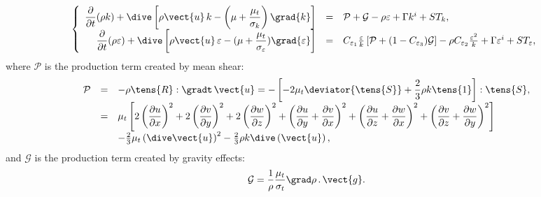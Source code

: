 \begin{equation}
\left\{
\begin{array}{r c l}
\displaystyle\frac{\partial }{\partial t}(\rho k)+\dive\left[ \rho \vect{u}%
\,k- \left( \mu +\frac{\mu _{t}}{\sigma _{k}} \right)\grad{k}\right] 
&=&
\mathcal{P}+\mathcal{G}-\rho \varepsilon +\Gamma k^{i}+ST_{k}, \\
\displaystyle\frac{\partial }{\partial t}(\rho \varepsilon )+\dive\left[
\rho \vect{u}\,\varepsilon -(\mu +\frac{\mu _{t}}{\sigma _{\varepsilon }})%
\grad{\varepsilon}\right] &=&C_{\varepsilon _{1}}\frac{\varepsilon }{k}\left[
\mathcal{P}+(1-C_{\varepsilon _{3}})\mathcal{G}\right] -\rho C_{\varepsilon
_{2}}\frac{\varepsilon ^{2}}{k}+\Gamma \varepsilon ^{i}+ST_{\varepsilon },%
\end{array}%
\right.
\end{equation}
where $\mathcal{P}$ is the production term created by mean shear:
%
\begin{equation}
\begin{array}{rcl}
\mathcal{P} & = & \displaystyle -\rho \tens{R} : \gradt \, \vect{u}
= -\left[-2 \mu_t \deviator{\tens{S}}%
+ \frac{2}{3}\rho k \tens{1}\right] : \tens{S}, \\
& = & \displaystyle \mu_t \left[ 2\left(\frac{\partial u}{\partial x}%
\right)^2+ 2\left(\frac{\partial v}{\partial y}\right)^2+ 2\left(\frac{%
\partial w}{\partial z}\right)^2+ \left(\frac{\partial u}{\partial y}+\frac{%
\partial v}{\partial x}\right)^2+ \left(\frac{\partial u}{\partial z}+\frac{%
\partial w}{\partial x}\right)^2+ \left(\frac{\partial v}{\partial z}+\frac{%
\partial w}{\partial y}\right)^2 \right] \\
&&-\frac{2}{3}\mu_t \left( \dive\vect{u} \right)^2-\frac{2}{3}
\rho k \dive \left( \vect{u} \right),
\end{array}
\end{equation}
and
$\mathcal{G}$ is the production term created by gravity effects: 
\begin{equation}
\displaystyle \mathcal{G}= \frac{1}{\rho}\frac{\mu_t}{\sigma_t} \grad \rho \, . \, \vect{g}.
\end{equation}

